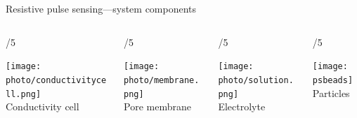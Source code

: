 \begin{frame}[c]{Resistive pulse sensing---system components}


	\begin{columns}[t]
		\begin{column}[T]{\paperwidth/5}
			{\centering
				\texttt{[image: photo/conductivitycell.png]} \\
				{\footnotesize Conductivity cell}
				\par
			}
		\end{column}
		
		
		\begin{column}[T]{\paperwidth/5}
			{\centering
				\texttt{[image: photo/membrane.png]} \\
				{\footnotesize Pore membrane}
				\par
			}
		\end{column}
		
		
		
		\begin{column}[T]{\paperwidth/5}
			{\centering
				\texttt{[image: photo/solution.png]} \\
				{\footnotesize Electrolyte}
				\par
			}
		\end{column}

		
		

		
		\begin{column}[T]{\paperwidth/5}
			{\centering
				\texttt{[image: psbeads]} \\
				{\footnotesize Particles}
				\par
			}
		\end{column}


\end{columns}
\end{frame}

